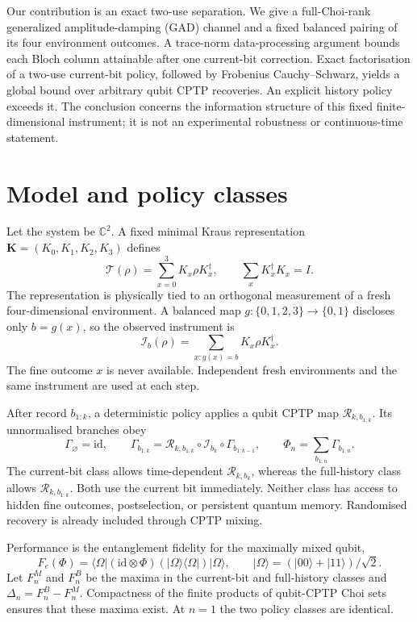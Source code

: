 \documentclass[11pt]{article}
\newcommand{\cI}{\mathcal I}
\newcommand{\cR}{\mathcal R}
\newcommand{\cT}{\mathcal T}
\newcommand{\id}{\mathrm{id}}
\begin{document}
Our contribution is an exact two-use separation.  We give a full-Choi-rank generalized
amplitude-damping (GAD) channel and a fixed balanced pairing of its four environment
outcomes.  A trace-norm data-processing argument bounds each Bloch column attainable
after one current-bit correction.  Exact factorisation of a two-use current-bit policy,
followed by Frobenius Cauchy--Schwarz, yields a global bound over arbitrary qubit CPTP
recoveries.  An explicit history policy exceeds it.  The conclusion concerns the
information structure of this fixed finite-dimensional instrument; it is not an
experimental robustness or continuous-time statement.

\section{Model and policy classes}

Let the system be $\mathbb C^2$.  A fixed minimal Kraus representation
$\bm K=(K_0,K_1,K_2,K_3)$ defines
\begin{equation}
  \cT(\rho)=\sum_{x=0}^{3}K_x\rho K_x^\dagger,
  \qquad \sum_xK_x^\dagger K_x=I.
  \label{eq:channel}
\end{equation}
The representation is physically tied to an orthogonal measurement of a fresh
four-dimensional environment.  A balanced map $g:\{0,1,2,3\}\to\{0,1\}$ discloses
only $b=g(x)$, so the observed instrument is
\begin{equation}
  \cI_b(\rho)=\sum_{x:g(x)=b}K_x\rho K_x^\dagger.
  \label{eq:instrument}
\end{equation}
The fine outcome $x$ is never available.  Independent fresh environments and the same
instrument are used at each step.

After record $b_{1:k}$, a deterministic policy applies a qubit CPTP map
$\cR_{k,b_{1:k}}$.  Its unnormalised branches obey
\begin{equation}
 \Gamma_{\varnothing}=\id,\qquad
 \Gamma_{b_{1:k}}=\cR_{k,b_{1:k}}\circ\cI_{b_k}
                     \circ\Gamma_{b_{1:k-1}},
 \qquad
 \Phi_n=\sum_{b_{1:n}}\Gamma_{b_{1:n}}.
 \label{eq:branches}
\end{equation}
The current-bit class allows time-dependent $\cR_{k,b_k}$, whereas the full-history
class allows $\cR_{k,b_{1:k}}$.  Both use the current bit immediately.  Neither class
has access to hidden fine outcomes, postselection, or persistent quantum memory.
Randomised recovery is already included through CPTP mixing.

Performance is the entanglement fidelity for the maximally mixed qubit,
\begin{equation}
 F_e(\Phi)=\langle\Omega| (\id\otimes\Phi)
 (|\Omega\rangle\langle\Omega|)|\Omega\rangle,
 \qquad |\Omega\rangle=(|00\rangle+|11\rangle)/\sqrt2.
 \label{eq:fidelity}
\end{equation}
Let $F_n^M$ and $F_n^B$ be the maxima in the current-bit and full-history classes and
$\Delta_n=F_n^B-F_n^M$.  Compactness of the finite products of qubit-CPTP Choi sets
ensures that these maxima exist.  At $n=1$ the two policy classes are identical.
\end{document}
